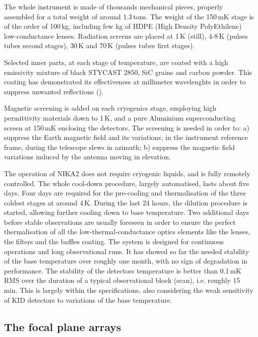 \documentclass[]{aa} %
\begin{document}
The whole instrument is made of thousands mechanical pieces, properly assembled for a total weight of around 1.3\,tons. The weight of the 150\,mK stage is of the order of 100\,kg, including few kg of HDPE (High Density PolyEthilene) low-conductance lenses. Radiation screens are placed at 1\,K (still), 4-8\,K (pulses tubes second stages), 30\,K and 70\,K (pulses tubes first stages).

Selected inner parts, at each stage of temperature, are coated with a high emissivity mixture of black STYCAST 2850, SiC grains and carbon powder. This coating has demonstrated its effectiveness at millimeter wavelenghts in order to suppress unwanted reflections (\cite{Calvo2010}).

Magnetic screening is added on each cryogenics stage, employing high permittivity materials down to 1\,K, and a pure Aluminium superconducting screen at 150\,mK enclosing the detectors. The screening is needed in order to: a) suppress the Earth magnetic field and its variations, in the instrument reference frame, during the telescope slews in azimuth; b) suppress the magnetic field variations induced by the antenna moving in elevation. 

The operation of NIKA2 does not require cryogenic liquids, and is fully remotely controlled. The whole cool-down procedure, largely automatised, lasts about five days. Four days are required for the pre-cooling and thermalisation of the three coldest stages at around 4\,K. During the last 24 hours, the dilution procedure is started, allowing further cooling down to base temperature. Two additional days before stable observations are usually foreseen in order to ensure the perfect thermalisation of all the low-thermal-conductance optics elements like the lenses, the filters and the baffles coating. The system is designed for continuous operations and long observational runs. It has showed so far the needed stability of the base temperature over roughly one month, with no sign of degradation in performance. The stability of the detectors temperature is better than 0.1\,mK RMS over the duration of a typical observational block (scan), i.e. roughly 15\,min. This is largely within the specifications, also considering the weak sensitivity of KID detectors to variations of the base temperature. 


 \subsection{The focal plane arrays}
\end{document}
